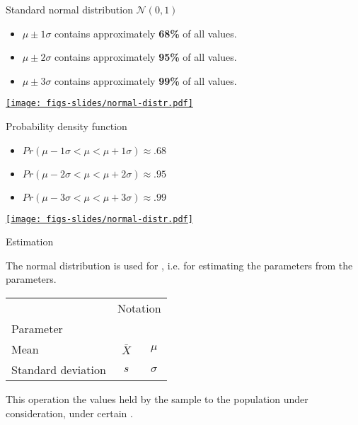 \documentclass{beamer}
\begin{document}
	
	\begin{frame}[t]{Standard normal distribution $\mathcal{N}(0,1)$}
	
	\begin{itemize}
		\item $\mu \pm 1\sigma$ contains approximately \textbf{68\%} of all values.
		\item $\mu \pm 2\sigma$ contains approximately \textbf{95\%} of all values.
		\item $\mu \pm 3\sigma$ contains approximately \textbf{99\%} of all values.
	\end{itemize}
	
	\begin{center}
		\href{http://en.wikipedia.org/wiki/Normal_distribution}{\texttt{[image: figs-slides/normal-distr.pdf]}}
	\end{center}
		
	\end{frame}

	\begin{frame}[t]{Probability density function}
	
	\begin{itemize}
		\item $Pr(\mu - 1\sigma < \mu < \mu + 1\sigma) \approx .68$
		\item $Pr(\mu - 2\sigma < \mu < \mu + 2\sigma) \approx .95$
		\item $Pr(\mu - 3\sigma < \mu < \mu + 3\sigma) \approx .99$
	\end{itemize}
	
	\begin{center}
		\href{http://en.wikipedia.org/wiki/Normal_distribution}{\texttt{[image: figs-slides/normal-distr.pdf]}}
	\end{center}
		
	\end{frame}
		
	\begin{frame}[t]{Estimation}

	The normal distribution is used for , i.e. for estimating the  parameters from the  parameters.\vspace{1em}

\begin{center}
\begin{tabular}{lcc}
	\toprule
	& \multicolumn{2}{c}{Notation} \\
	\cmidrule(r){2-3}
	Parameter & \red{Sample} & \red{Population} \\
	\midrule
	Mean & $\bar X$ & $\mu$ \\
	Standard deviation & $s$ & $\sigma$ \\
	\bottomrule
\end{tabular}
\end{center}
	\vspace{1em}
	
	This operation  the values held by the sample to the population under consideration, under certain .

	\end{frame}
	
\end{document}
